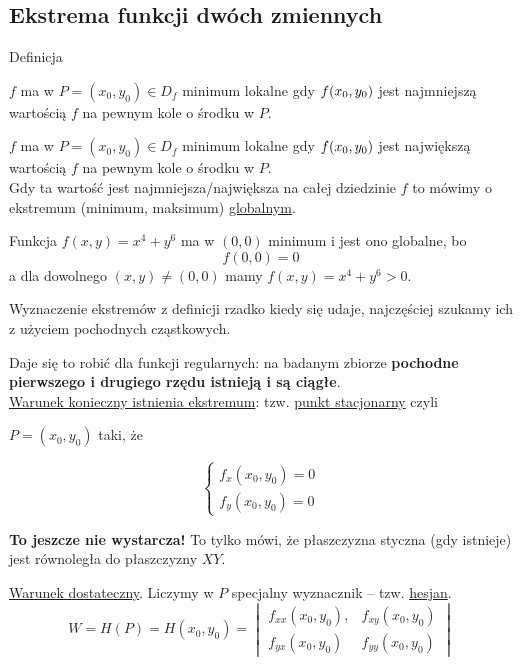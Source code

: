 \subsection*{Ekstrema funkcji dwóch zmiennych}

\begin{tw}{Definicja}

$f$ ma w $ P = (x_0, y_0) \in D_f $ minimum lokalne gdy $ f(x_0, y_0) $ jest najmniejszą wartością $f$ na pewnym kole o środku w $P$.

$f$ ma w $ P = (x_0, y_0) \in D_f $ minimum lokalne gdy $ f(x_0, y_0) $ jest największą wartością $f$ na pewnym kole o środku w $P$. \\

Gdy ta wartość jest najmniejsza/największa na całej dziedzinie $f$ to mówimy o ekstremum (minimum, maksimum) \underline{globalnym}.
\end{tw}

\begin{przyklad}
Funkcja $ f(x,y) = x^4 + y^6 $ ma w $(0,0)$ minimum i jest ono globalne, bo
$$ f(0,0) = 0 $$
a dla dowolnego $ (x,y) \neq (0,0) $ mamy $ f(x,y) = x^4 + y^6 > 0 $.
\end{przyklad}

Wyznaczenie ekstremów z definicji rzadko kiedy się udaje, najczęściej szukamy ich z użyciem pochodnych cząstkowych.

Daje się to robić dla funkcji regularnych: na badanym zbiorze \textbf{pochodne pierwszego i drugiego rzędu istnieją i są ciągłe}. \\

\underline{Warunek konieczny istnienia ekstremum}: tzw. \underline{punkt stacjonarny} czyli

$ P = (x_0, y_0) $ taki, że 

$$ \left\{ \begin{aligned} f_x(x_0, y_0) = 0 \\ f_y(x_0, y_0) = 0  \end{aligned} \right. $$

\textbf{To jeszcze nie wystarcza!} To tylko mówi, że płaszczyzna styczna (gdy istnieje) jest równoległa do płaszczyzny $XY$.

\underline{Warunek dostateczny}. Liczymy w $P$ specjalny wyznacznik -- tzw. \underline{hesjan}.
$$ W = H(P) = H(x_0, y_0) = \begin{vmatrix} f_{xx}(x_0, y_0), & f_{xy}(x_0, y_0) \\ f_{yx}(x_0, y_0) & f_{yy}(x_0, y_0) \end{vmatrix} $$

